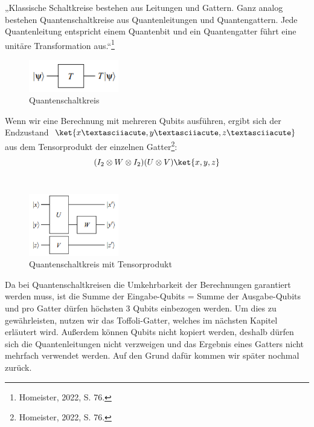 „Klassische Schaltkreise bestehen aus Leitungen und Gattern.
Ganz analog bestehen Quantenschaltkreise aus Quantenleitungen und Quantengattern.
Jede Quantenleitung entspricht einem Quantenbit und ein Quantengatter führt eine unitäre Transformation aus.“\footnote{Homeister, 2022, S. 76.}\\
\begin{figure}[H]
    \centering
    \includegraphics[width=0.35\textwidth]{img/Quantengatter Basic}
    \caption{Quantenschaltkreis}
    \label{fig:quantenschaltkreis}
\end{figure}

Wenn wir eine Berechnung mit mehreren Qubits ausführen, ergibt sich der Endzustand $\ket{x´, y´, z´}$ aus dem Tensorprodukt der einzelnen Gatter\footnote{Homeister, 2022, S. 76.}:\\
\begin{equation}
    (I_{2} \otimes W \otimes I_{2})(U \otimes V)\ket{x, y, z}
\end{equation}\\

\begin{figure}[H]
    \centering
    \includegraphics[width=0.35\textwidth]{img/Quantengatter 3er}
    \caption{Quantenschaltkreis mit Tensorprodukt}
    \label{fig:quantenschaltkreis-tensorprodukt}
\end{figure}

Da bei Quantenschaltkreisen die Umkehrbarkeit der Berechnungen garantiert werden muss, ist die Summe der Eingabe-Qubits = Summe der Ausgabe-Qubits und pro Gatter dürfen höchsten 3 Qubits einbezogen werden.
Um dies zu gewährleisten, nutzen wir das Toffoli-Gatter, welches im nächsten Kapitel erläutert wird.
Außerdem können Qubits nicht kopiert werden, deshalb dürfen sich die Quantenleitungen nicht verzweigen und das Ergebnis eines Gatters nicht mehrfach verwendet werden.
Auf den Grund dafür kommen wir später nochmal zurück.\\

